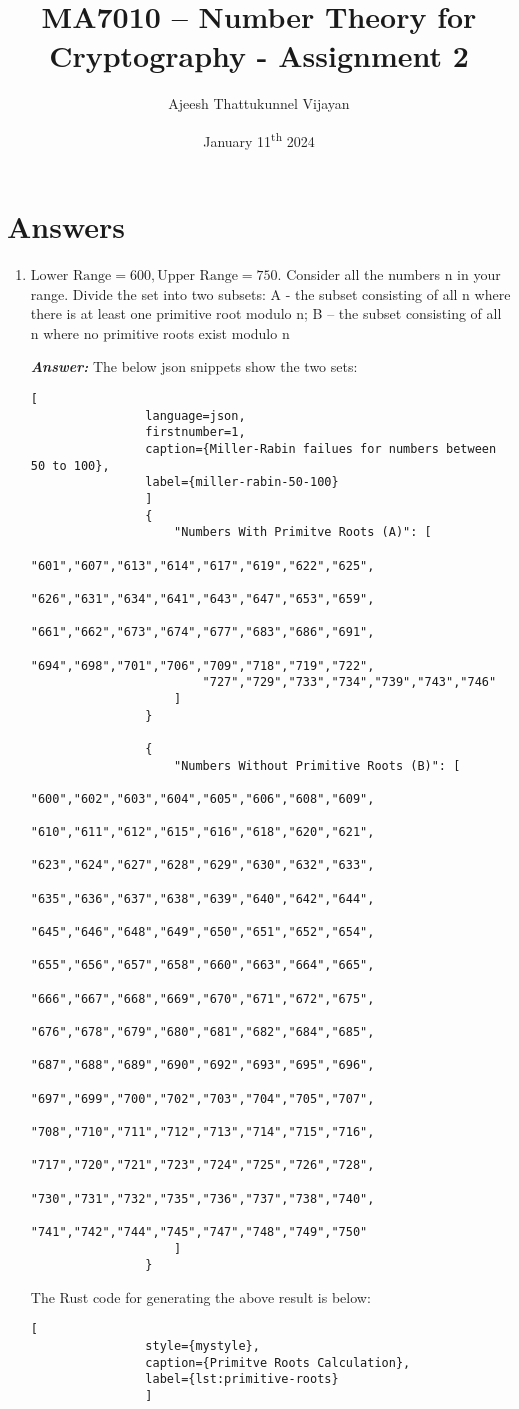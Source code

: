 \documentclass[11pt,a4paper]{article}
\title{MA7010 – Number Theory for Cryptography - Assignment 2}
\author{Ajeesh Thattukunnel Vijayan}
\date{January 11\textsuperscript{th} 2024}
\begin{document}
	
	\maketitle
	\section{Answers} \label{sec:Forces}
	
	\begin{enumerate}[1.]
		\item $\text{Lower Range} = 600, \text{Upper Range} = 750$. Consider all the numbers n in your range. Divide the set into two subsets:
		A - the subset consisting of all n where there is at least one primitive root modulo n; B – the subset consisting of all n where no primitive roots exist modulo n
		\bigskip
		\begin{flushleft}
			\textbf{\textit{Answer:}} The below json snippets show the two sets:
			\begin{lstlisting}[
				language=json,
				firstnumber=1,
				caption={Miller-Rabin failues for numbers between 50 to 100},
				label={miller-rabin-50-100}
				]
				{
					"Numbers With Primitve Roots (A)": [ 
						"601","607","613","614","617","619","622","625",
						"626","631","634","641","643","647","653","659",
						"661","662","673","674","677","683","686","691",
						"694","698","701","706","709","718","719","722",
						"727","729","733","734","739","743","746"
					]
				}

				{
					"Numbers Without Primitive Roots (B)": [
						"600","602","603","604","605","606","608","609",
						"610","611","612","615","616","618","620","621",
						"623","624","627","628","629","630","632","633",
						"635","636","637","638","639","640","642","644",
						"645","646","648","649","650","651","652","654",
						"655","656","657","658","660","663","664","665",
						"666","667","668","669","670","671","672","675",
						"676","678","679","680","681","682","684","685",
						"687","688","689","690","692","693","695","696",
						"697","699","700","702","703","704","705","707",
						"708","710","711","712","713","714","715","716",
						"717","720","721","723","724","725","726","728",
						"730","731","732","735","736","737","738","740",
						"741","742","744","745","747","748","749","750"
					]
				}
			\end{lstlisting}
			
			The Rust code for generating the above result is below:
			\begin{lstlisting}[
				style={mystyle},
				caption={Primitve Roots Calculation},
				label={lst:primitive-roots}
				]
				

\end{lstlisting}
\end{flushleft}
\end{enumerate}
\end{document}

